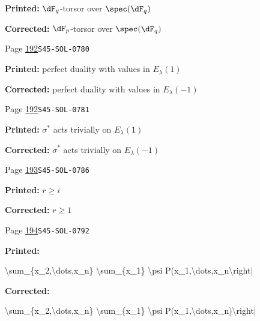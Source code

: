 \begin{description}
\par\noindent\textbf{Printed:} $\dF_q$-torsor over $\spec(\dF_q)$
\par\noindent\textbf{Corrected:} $\dF_p$-torsor over $\spec(\dF_q)$
\smallskip
\item[\hypertarget{apparatus:EN-0121}{121}] Page \hyperlink{printpage:en:192}{192}\quad\texttt{S45-SOL-0780}
\par\noindent\textbf{Printed:} perfect duality with values in $E_\lambda(1)$
\par\noindent\textbf{Corrected:} perfect duality with values in $E_\lambda(-1)$
\smallskip
\item[\hypertarget{apparatus:EN-0122}{122}] Page \hyperlink{printpage:en:192}{192}\quad\texttt{S45-SOL-0781}
\par\noindent\textbf{Printed:} $\sigma^\ast$ acts trivially on $E_\lambda(1)$
\par\noindent\textbf{Corrected:} $\sigma^\ast$ acts trivially on $E_\lambda(-1)$
\smallskip
\item[\hypertarget{apparatus:EN-0123}{123}] Page \hyperlink{printpage:en:193}{193}\quad\texttt{S45-SOL-0786}
\par\noindent\textbf{Printed:} $r\geqslant i$
\par\noindent\textbf{Corrected:} $r\geqslant 1$
\smallskip
\item[\hypertarget{apparatus:EN-0124}{124}] Page \hyperlink{printpage:en:194}{194}\quad\texttt{S45-SOL-0792}
\par\noindent\textbf{Printed:} {\footnotesize\ttfamily\raggedright \textbackslash{}\allowbreak{}sum\_\allowbreak{}\{\allowbreak{}x\_\allowbreak{}2,\allowbreak{}\textbackslash{}\allowbreak{}dots,\allowbreak{}x\_\allowbreak{}n\}\allowbreak{} \textbackslash{}\allowbreak{}sum\_\allowbreak{}\{\allowbreak{}x\_\allowbreak{}1\}\allowbreak{} \textbackslash{}\allowbreak{}psi P(\allowbreak{}x\_\allowbreak{}1,\allowbreak{}\textbackslash{}\allowbreak{}dots,\allowbreak{}x\_\allowbreak{}n\textbackslash{}\allowbreak{}right|\par}
\par\noindent\textbf{Corrected:} {\footnotesize\ttfamily\raggedright \textbackslash{}\allowbreak{}sum\_\allowbreak{}\{\allowbreak{}x\_\allowbreak{}2,\allowbreak{}\textbackslash{}\allowbreak{}dots,\allowbreak{}x\_\allowbreak{}n\}\allowbreak{} \textbackslash{}\allowbreak{}sum\_\allowbreak{}\{\allowbreak{}x\_\allowbreak{}1\}\allowbreak{} \textbackslash{}\allowbreak{}psi P(\allowbreak{}x\_\allowbreak{}1,\allowbreak{}\textbackslash{}\allowbreak{}dots,\allowbreak{}x\_\allowbreak{}n)\allowbreak{}\textbackslash{}\allowbreak{}right|\par}

\end{description}
